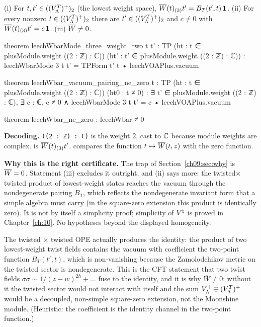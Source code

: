 \begin{theorem}\label{ch09:thm:nonzero}
\textup{(i)} For $t,t'\in((V_{\Lambda}^{T})^{+})_2$ (the lowest weight space),
$\overline{W}(t)_{(3)}t'=B_T(t',t)\,\mathbf1$.
\textup{(ii)} For every nonzero $t\in((V_{\Lambda}^{T})^{+})_2$ there are $t'\in((V_{\Lambda}^{T})^{+})_2$ and $c\neq0$ with
$\overline{W}(t)_{(3)}t'=c\,\mathbf1$.
\textup{(iii)} $\overline{W}\neq0$.
\end{theorem}
\begin{leancode}
theorem leechWbarMode_three_weight_two {t t' : TP} (ht : t ∈ plusModule.weight ((2 : ℤ) : ℂ))
    (ht' : t' ∈ plusModule.weight ((2 : ℤ) : ℂ)) :
    leechWbarMode 3 t t' = TPForm t' t • leechVOAPlus.vacuum

theorem leechWbar_vacuum_pairing_ne_zero {t : TP} (ht : t ∈ plusModule.weight ((2 : ℤ) : ℂ))
    (ht0 : t ≠ 0) :
    ∃ t' ∈ plusModule.weight ((2 : ℤ) : ℂ), ∃ c : ℂ, c ≠ 0 ∧
      leechWbarMode 3 t t' = c • leechVOAPlus.vacuum

theorem leechWbar_ne_zero : leechWbar ≠ 0
\end{leancode}
\begin{dictionary}
\textbf{Decoding.} \texttt{((2 : ℤ) : ℂ)} is the weight $2$, cast to ${\mathbb{C}}$ because module weights are
complex.  is $\overline{W}(t)_{(3)}t'$.  compares the
function $t\mapsto\overline{W}(t,z)$ with the zero function.

\textbf{Why this is the right certificate.} The trap of Section~\ref{ch09:sec:why} is
$\overline{W}=0$. Statement (iii) excludes it outright, and (ii) says more: the twisted$\times$twisted
product of lowest-weight states reaches the vacuum through the nondegenerate pairing $B_T$, which
reflects the nondegenerate invariant form that a simple algebra must carry (in the square-zero
extension this product is identically zero). It is not by itself a simplicity proof; simplicity of ${V^{\natural}}$ is
proved in Chapter~\ref{ch:10}. No hypotheses beyond the displayed homogeneity.
\end{dictionary}
\begin{physics}
The twisted $\times$ twisted OPE actually produces the identity: the product of two lowest-weight twist fields contains the vacuum with coefficient the two-point function $B_T(t',t)$, which is non-vanishing because the Zamolodchikov metric on the twisted sector is nondegenerate. This is the CFT statement that two twist fields $\sigma\sigma\sim1/(z-w)^{2h}+\dots$ fuse to the identity, and it is why $\overline W\neq0$: without it the twisted sector would not interact with itself and the sum $V_{\Lambda}^{+}\oplus(V_{\Lambda}^{T})^{+}$ would be a decoupled, non-simple square-zero extension, not the Moonshine module. (Heuristic: the coefficient is the identity channel in the two-point function.)
\end{physics}

